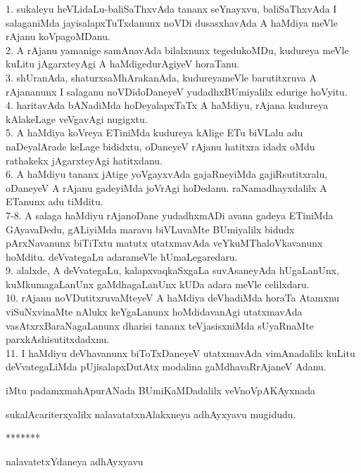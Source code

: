 \documentclass{article}
\begin{document}
1. sukaleyu heVLidaLu-baliSaThxvAda tananx seYnayxvu, baliSaThxvAda I salaganiMda jayisalapxTuTxdanunx noVDi dusasxhavAda A haMdiya meVle rAjanu koVpagoMDanu.\\
2. A rAjanu yamanige samAnavAda bilalxnunx tegedukoMDu, kudureya meVle kuLitu jAgarxteyAgi A haMdigedurAgiyeV horaTanu.\\
3. shUranAda, shaturxsaMhArakanAda, kudureyameVle barutitxruva A rAjananunx I salaganu noVDidoDaneyeV yudadhxBUmiyalilx edurige hoVyitu.\\
4. haritavAda bANadiMda hoDeyalapxTaTx A haMdiyu, rAjana kudureya kAlakeLage veVgavAgi nugigxtu.\\
5. A haMdiya koVreya ETiniMda kudureya kAlige ETu biVLalu adu naDeyalArade keLage bididxtu, oDaneyeV rAjanu hatitxra idadx oMdu rathakekx jAgarxteyAgi hatitxdanu.\\
6. A haMdiyu tananx jAtige yoVgayxvAda gajaRneyiMda gajiRsutitxralu, oDaneyeV A rAjanu gadeyiMda joVrAgi hoDedanu. raNamadhayxdalilx A ETanunx adu tiMditu.\\
7-8. A salaga haMdiyu rAjanoDane yudadhxmADi avana gadeya ETiniMda GAyavaDedu, gALiyiMda maravu biVLuvaMte BUmiyalilx bidudx pArxNavanunx biTiTxtu matutx utatxmavAda veYkuMThaloVkavanunx hoMditu. deVvategaLu adarameVle hUmaLegaredaru.\\
9. alalxde, A deVvategaLu, kalapxvaqkaSxgaLa suvAsaneyAda hUgaLanUnx, kuMkumagaLanUnx gaMdhagaLanUnx kUDa adara meVle celilxdaru.\\
10. rAjanu noVDutitxruvaMteyeV A haMdiya deVhadiMda horaTa Atamxnu viSuNxvinaMte nAlukx keYgaLanunx hoMdidavanAgi utatxmavAda vasAtxrxBaraNagaLanunx dharisi tananx teVjasisxniMda sUyaRnaMte parxkAshisutitxdadxnu.\\
11. I haMdiyu deVhavanunx biToTxDaneyeV utatxmavAda vimAnadalilx kuLitu deVvategaLiMda pUjisalapxDutAtx modalina gaMdhavaRrAjaneV Adanu.\\

\begin{center}
iMtu padamxmahApurANada BUmiKaMDadalilx veVnoVpAKAyxnada
\end{center}

\begin{center}
sukalAcariterxyalilx nalavatatxnAlakxneya adhAyxyavu mugidudu.
\end{center}

\begin{center}
*******
\end{center}

\begin{center}
nalavatetxYdaneya adhAyxyavu
\end{center}
\end{document}

